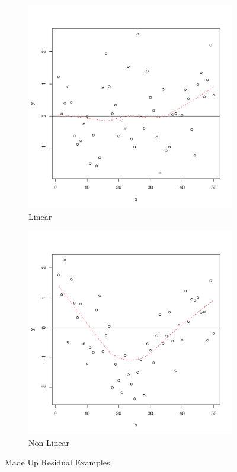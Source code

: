 \documentclass[11pt,openany]{book}\usepackage[]{graphicx}\usepackage[]{color}
\begin{document}
{\begin{figure}
        \centering
        \begin{subfigure}[b]{0.45\textwidth}
                \centering
                \includegraphics[width=\textwidth]{15_Diagnostics/convar2.pdf}%
                \caption{Linear \label{fig:convar2}}
        \end{subfigure}
        \begin{subfigure}[b]{0.45\textwidth}
                \centering
                \includegraphics[width=\textwidth]{15_Diagnostics/nonlin.pdf}
                \caption{Non-Linear \label{fig:nonlin}}
        \end{subfigure}
        \caption{Made Up Residual Examples}
\end{figure} 

}
\end{document}
